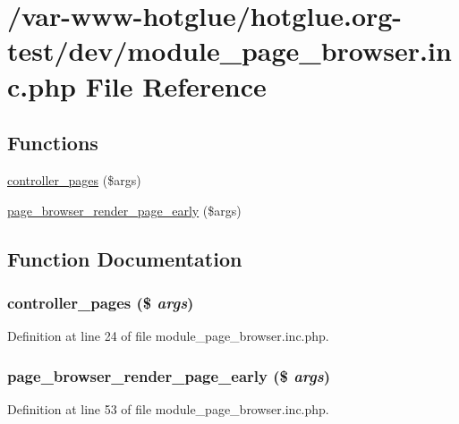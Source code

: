 \hypertarget{module__page__browser_8inc_8php}{
\section{/var-\/www-\/hotglue/hotglue.org-\/test/dev/module\_\-page\_\-browser.inc.php File Reference}
\label{module__page__browser_8inc_8php}
}
\subsection*{Functions}
\begin{DoxyCompactItemize}
\item 
\hyperlink{module__page__browser_8inc_8php_a7e937f92734b69829f9d3ab5e00f14e0}{controller\_\-pages} (\$args)
\item 
\hyperlink{module__page__browser_8inc_8php_aa94d17bbea100ee50f09c7bf4094a1db}{page\_\-browser\_\-render\_\-page\_\-early} (\$args)
\end{DoxyCompactItemize}


\subsection{Function Documentation}
\hypertarget{module__page__browser_8inc_8php_a7e937f92734b69829f9d3ab5e00f14e0}{
\subsubsection[{controller\_\-pages}]{\setlength{\rightskip}{0pt plus 5cm}controller\_\-pages (\$ {\em args})}}
\label{module__page__browser_8inc_8php_a7e937f92734b69829f9d3ab5e00f14e0}


Definition at line 24 of file module\_\-page\_\-browser.inc.php.

\hypertarget{module__page__browser_8inc_8php_aa94d17bbea100ee50f09c7bf4094a1db}{
\subsubsection[{page\_\-browser\_\-render\_\-page\_\-early}]{\setlength{\rightskip}{0pt plus 5cm}page\_\-browser\_\-render\_\-page\_\-early (\$ {\em args})}}
\label{module__page__browser_8inc_8php_aa94d17bbea100ee50f09c7bf4094a1db}


Definition at line 53 of file module\_\-page\_\-browser.inc.php.

